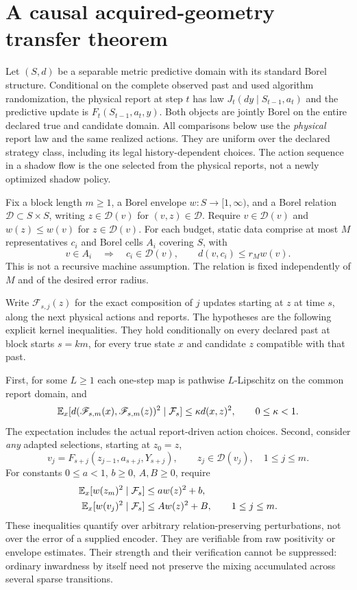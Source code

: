 \section{A causal acquired-geometry transfer theorem}\label{sec:main}
Let $(S,d)$ be a separable metric predictive domain with its standard Borel structure. Conditional on the complete observed past and used algorithm randomization, the physical report at step $t$ has law $J_t(dy\mid S_{t-1},a_t)$ and the predictive update is $F_t(S_{t-1},a_t,y)$. Both objects are jointly Borel on the entire declared true and candidate domain. All comparisons below use the \emph{physical} report law and the same realized actions. They are uniform over the declared strategy class, including its legal history-dependent choices. The action sequence in a shadow flow is the one selected from the physical reports, not a newly optimized shadow policy.

Fix a block length $m\ge1$, a Borel envelope $w:S\to[1,\infty)$, and a Borel relation $\mathcal D\subset S\times S$, writing $z\in\mathcal D(v)$ for $(v,z)\in\mathcal D$. Require $v\in\mathcal D(v)$ and $w(z)\le w(v)$ for $z\in\mathcal D(v)$. For each budget, static data comprise at most $M$ representatives $c_i$ and Borel cells $A_i$ covering $S$, with
\begin{equation}\label{eq:static}
 v\in A_i\quad\Longrightarrow\quad
 c_i\in\mathcal D(v),\qquad d(v,c_i)\le r_M w(v).
\end{equation}
This is not a recursive machine assumption. The relation is fixed independently of $M$ and of the desired error radius.

Write $\mathscr F_{s,j}(z)$ for the exact composition of $j$ updates starting at $z$ at time $s$, along the next physical actions and reports. The hypotheses are the following explicit kernel inequalities. They hold conditionally on every declared past at block starts $s=km$, for every true state $x$ and candidate $z$ compatible with that past.

First, for some $L\ge1$ each one-step map is pathwise $L$-Lipschitz on the common report domain, and
\begin{equation}\label{eq:blockpair}
 \mathbb E_x[d(\mathscr F_{s,m}(x),\mathscr F_{s,m}(z))^2\mid\mathcal F_s]
 \le\kappa d(x,z)^2,\qquad 0\le\kappa<1.
\end{equation}
The expectation includes the actual report-driven action choices. Second, consider \emph{any} adapted selections, starting at $z_0=z$,
\[
 v_j=F_{s+j}(z_{j-1},a_{s+j},Y_{s+j}),\qquad
 z_j\in\mathcal D(v_j),\quad 1\le j\le m.
\]
For constants $0\le a<1$, $b\ge0$, $A,B\ge0$, require
\begin{align}
 \mathbb E_x[w(z_m)^2\mid\mathcal F_s]&\le a w(z)^2+b,\label{eq:robustdrift}\\
 \mathbb E_x[w(v_j)^2\mid\mathcal F_s]&\le A w(z)^2+B,
                 \qquad 1\le j\le m.\label{eq:within}
\end{align}
These inequalities quantify over arbitrary relation-preserving perturbations, not over the error of a supplied encoder. They are verifiable from raw positivity or envelope estimates. Their strength and their verification cannot be suppressed: ordinary inwardness by itself need not preserve the mixing accumulated across several sparse transitions.

